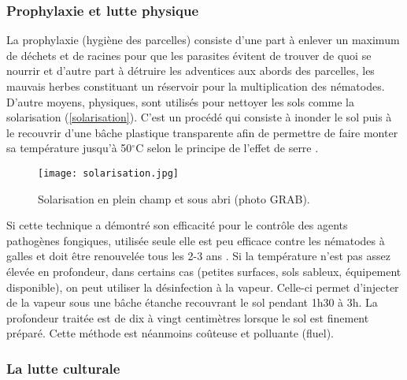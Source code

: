 \subsubsection{Prophylaxie et lutte physique}
		
	 La prophylaxie (hygiène des parcelles) consiste d'une part à  enlever un maximum de déchets et de racines pour que les parasites évitent de trouver de quoi se nourrir et d'autre part à détruire les adventices aux abords des parcelles, les mauvais herbes constituant un réservoir pour la multiplication des nématodes. D'autre moyens, physiques, sont utilisés pour nettoyer les sols  comme la solarisation  (\autoref{solarisation}). C'est un procédé qui consiste à inonder le sol  puis à le   recouvrir d'une bâche plastique transparente    afin de permettre de faire monter sa température jusqu’à 50$^{\circ}$C selon le principe de l'effet de serre  \citep{Porter1983}.
	
	\begin{figure}
		\centering \texttt{[image: solarisation.jpg]}
		\caption{Solarisation en plein champ et sous abri (photo GRAB).}
		\label{solarisation}
	\end{figure}
	
	Si cette technique a démontré son efficacité pour le contrôle des agents pathogènes fongiques,  utilisée seule elle est  peu efficace  contre les nématodes à galles et doit être renouvelée tous les 2-3 ans \citep{Anastasiadis2008}. Si la température n’est pas assez élevée en profondeur, dans certains cas (petites surfaces, sols sableux, équipement disponible), on peut utiliser la désinfection à la vapeur. Celle-ci permet d’injecter de la vapeur sous une bâche étanche recouvrant le sol pendant 1h30 à 3h. La profondeur traitée est de dix à vingt centimètres lorsque le sol est finement préparé. Cette méthode est néanmoins coûteuse et polluante (fluel).
	
	
\subsubsection{La lutte culturale} \label{lutte:culturale}
		
